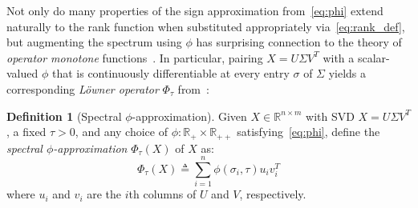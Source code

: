 \documentclass[10pt]{article}
\numberwithin{equation}{section}
\newcommand{\+}{%
	\raisebox{0.18ex}{\scaleobj{0.55}{+}}
}
\theoremstyle{definition}
\newtheorem{definition}{Definition}
\theoremstyle{definition}
\begin{document}
Not only do many properties of the sign approximation from~\eqref{eq:phi} extend naturally to the rank function when substituted appropriately via~\eqref{eq:rank_def}, but augmenting the spectrum using $\phi$ has surprising connection to the theory of \emph{operator monotone} functions~\cite{bhatia2013matrix}.
In particular, pairing $X = U\Sigma V^T$ with a scalar-valued $\phi$ that is continuously differentiable at every entry $\sigma$ of $\Sigma$ yields a corresponding \emph{Löwner operator} $\Phi_\tau$ from~\cite{bhatia2013matrix, bi2013approximation}: 
\begin{definition}[Spectral $\phi$-approximation]
	Given $X \in \mathbb{R}^{n \times m}$ with SVD $X = U \Sigma V^T$, a fixed $\tau > 0$, and any choice of $\phi: \mathbb{R}_+ \times \mathbb{R}_{++}$ satisfying~\eqref{eq:phi}, define the \emph{spectral $\phi$-approximation} $\Phi_\tau(X)$ of $X$ as:
	\begin{equation}\label{def:lowner}%
		\Phi_\tau (X) \triangleq \sum\limits_{i=1}^{n} \phi(\sigma_i, \tau) u_i v_i^T
	\end{equation}
	where $u_i$ and $v_i$ are the $i$th columns of $U$ and $V$, respectively. 
\end{definition}
\end{document}
